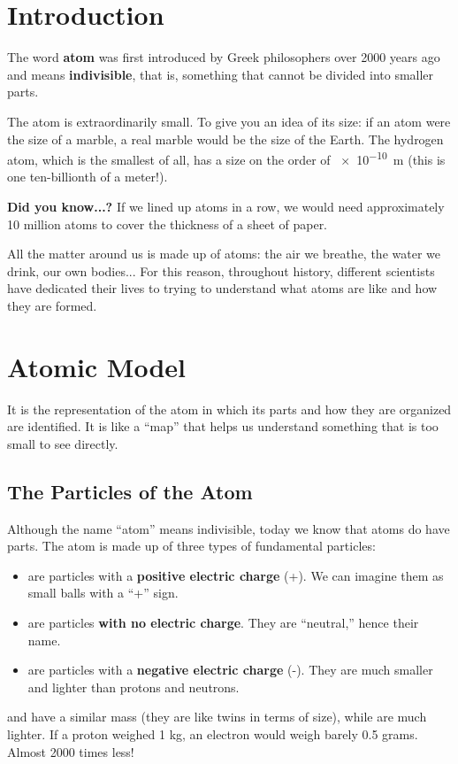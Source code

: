 
\section{Introduction}
The word \textbf{atom} was first introduced by Greek philosophers over 2000 years ago and means \textbf{indivisible}, that is, something that cannot be divided into smaller parts.

The atom is extraordinarily small. To give you an idea of its size: if an atom were the size of a marble, a real marble would be the size of the Earth. The hydrogen atom, which is the smallest of all, has a size on the order of \qty{e-10}{\metre} (this is one ten-billionth of a meter!).
\begin{remark}
    \textbf{Did you know...?} If we lined up atoms in a row, we would need approximately 10 million atoms to cover the thickness of a sheet of paper.
\end{remark}
All the matter around us is made up of atoms: the air we breathe, the water we drink, our own bodies... For this reason, throughout history, different scientists have dedicated their lives to trying to understand what atoms are like and how they are formed.
\section{Atomic Model}
\begin{definition}
    It is the representation of the atom in which its parts and how they are organized are identified. It is like a ``map'' that helps us understand something that is too small to see directly.
\end{definition}
\subsection{The Particles of the Atom}

Although the name ``atom'' means indivisible, today we know that atoms do have parts. The atom is made up of three types of fundamental particles:
\begin{itemize}
    \item {} are particles with a \textbf{positive electric charge} (+). We can imagine them as small balls with a ``+'' sign.
    \item {} are particles \textbf{with no electric charge}. They are ``neutral,'' hence their name.
    \item {} are particles with a \textbf{negative electric charge} (-). They are much smaller and lighter than protons and neutrons.
\end{itemize}
\begin{remark}
    \prt{} and \ntr{} have a similar mass (they are like twins in terms of size), while \el{} are much lighter. If a proton weighed 1 kg, an electron would weigh barely 0.5 grams. Almost 2000 times less!
\end{remark}
